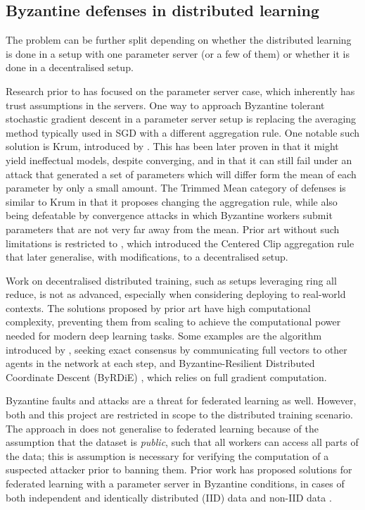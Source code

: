 \documentclass{article}
\begin{document}
\subsection{Byzantine defenses in distributed learning}
The problem can be further split depending on whether the distributed learning is done in a setup with one parameter server (or a few of them) or whether it is done in a decentralised setup.

Research prior to \cite{gorbunov2021secure} has focused on the parameter server case, which inherently has trust assumptions in the servers. One way to approach Byzantine tolerant stochastic gradient descent in a parameter server setup is replacing the averaging method typically used in SGD with a different aggregation rule.
One notable such solution is Krum, introduced by \cite{blanchard2017machine}. This has been later proven in \cite{el2018hidden} that it might yield ineffectual models, despite converging, and in \cite{baruch2019little} that it can still fail under an attack that generated a set of parameters which will differ form the mean of each parameter by only a small amount. The Trimmed Mean category of defenses \citep{xie2018generalized, yin2018byzantine} is similar to Krum in that it proposes changing the aggregation rule, while also being defeatable by convergence attacks in which Byzantine workers submit parameters that are not very far away from the mean. Prior art without such limitations is restricted to \cite{karimireddy2021learning}, which introduced the Centered Clip aggregation rule that \cite{gorbunov2021secure} later generalise, with modifications, to a decentralised setup. 

Work on decentralised distributed training, such as setups leveraging ring all reduce, is not as advanced, especially when considering deploying to real-world contexts. The solutions proposed by prior art have high computational complexity, preventing them from scaling to achieve the computational power needed for modern deep learning tasks. Some examples are the algorithm introduced by \cite{gupta2021byzantine}, seeking exact consensus by communicating full vectors to other agents in the network at each step, and Byzantine-Resilient Distributed Coordinate Descent (ByRDiE) \citep{yang2019byrdie}, which relies on full gradient computation. 

Byzantine faults and attacks are a threat for federated learning as well. However, both \cite{gorbunov2021secure} and this project are restricted in scope to the distributed training scenario. The approach in \cite{gorbunov2021secure} does not generalise to federated learning because of the assumption that the dataset is \textit{public}, such that all workers can access all parts of the data; this is assumption is necessary for verifying the computation of a suspected attacker prior to banning them. Prior work has proposed solutions for federated learning with a parameter server in Byzantine conditions, in cases of both independent and identically distributed (IID) data \citep{chen2017distributed, blanchard2017machine} and non-IID data \citep{prakash2020mitigating}.
\end{document}
